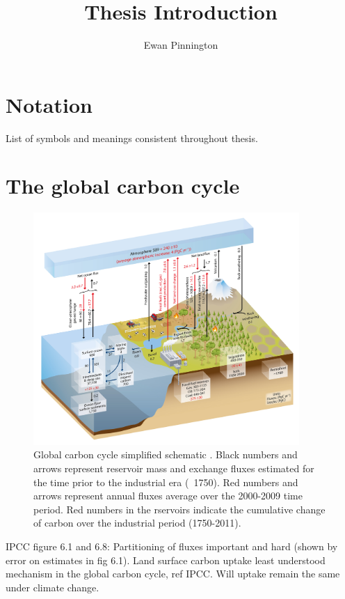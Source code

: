 \documentclass[11pt]{article}
\title{Thesis Introduction}
\author{Ewan Pinnington}
\begin{document}
\maketitle

\section{Notation}
List of symbols and meanings consistent throughout thesis.

\section{The global carbon cycle}

\begin{figure}[ht]
    \centering
    \includegraphics[width=0.9\textwidth]{ipcc_fig6_1.jpg}
    \caption{Global carbon cycle simplified schematic \citep{ciais2014carbon}. Black numbers and arrows represent reservoir mass and exchange fluxes estimated for the time prior to the industrial era (~1750). Red numbers and arrows represent annual fluxes average over the 2000-2009 time period. Red numbers in the rservoirs indicate the cumulative change of carbon over the industrial period (1750-2011).}
    \label{fig:ipcc_fig6.1}
\end{figure}

IPCC figure 6.1 and 6.8: Partitioning of fluxes important and hard (shown by error on estimates in fig 6.1). Land surface carbon uptake least understood mechanism in the global carbon cycle, ref IPCC. Will uptake remain the same under climate change.
\end{document}
